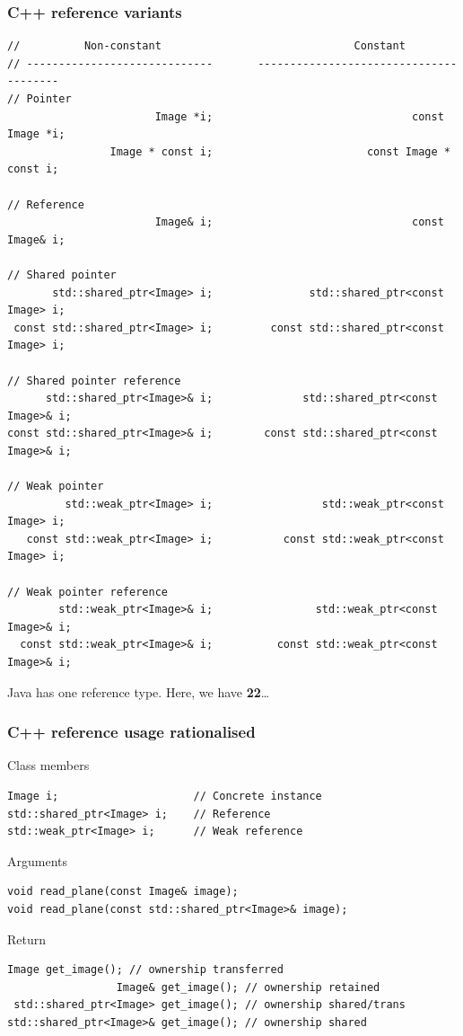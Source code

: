 \documentclass{beamer}
\begin{document}
\begin{frame}[fragile]
  \frametitle{C++ reference variants}
  \begin{lstlisting}[basicstyle=\tiny\ttfamily]
//          Non-constant                              Constant
// -----------------------------       ---------------------------------------
// Pointer
                       Image *i;                               const Image *i;
                Image * const i;                        const Image * const i;

// Reference
                       Image& i;                               const Image& i;

// Shared pointer
       std::shared_ptr<Image> i;               std::shared_ptr<const Image> i;
 const std::shared_ptr<Image> i;         const std::shared_ptr<const Image> i;

// Shared pointer reference
      std::shared_ptr<Image>& i;              std::shared_ptr<const Image>& i;
const std::shared_ptr<Image>& i;        const std::shared_ptr<const Image>& i;

// Weak pointer
         std::weak_ptr<Image> i;                 std::weak_ptr<const Image> i;
   const std::weak_ptr<Image> i;           const std::weak_ptr<const Image> i;

// Weak pointer reference
        std::weak_ptr<Image>& i;                std::weak_ptr<const Image>& i;
  const std::weak_ptr<Image>& i;          const std::weak_ptr<const Image>& i;
\end{lstlisting}
\begin{center}
  Java has one reference type.  Here, we have \textbf{22}…
\end{center}
\end{frame}

\begin{frame}[fragile]
  \frametitle{C++ reference usage rationalised}
\begin{block}{Class members}
  \begin{lstlisting}[basicstyle=\scriptsize\ttfamily]
Image i;                     // Concrete instance
std::shared_ptr<Image> i;    // Reference
std::weak_ptr<Image> i;      // Weak reference
\end{lstlisting}
\end{block}
\begin{block}{Arguments}
  \begin{lstlisting}[basicstyle=\scriptsize\ttfamily]
void read_plane(const Image& image);
void read_plane(const std::shared_ptr<Image>& image);
\end{lstlisting}
\end{block}
\begin{block}{Return}
  \begin{lstlisting}[basicstyle=\scriptsize\ttfamily]
                  Image get_image(); // ownership transferred
                 Image& get_image(); // ownership retained
 std::shared_ptr<Image> get_image(); // ownership shared/trans
std::shared_ptr<Image>& get_image(); // ownership shared
\end{lstlisting}
\end{block}
\end{frame}
\end{document}

